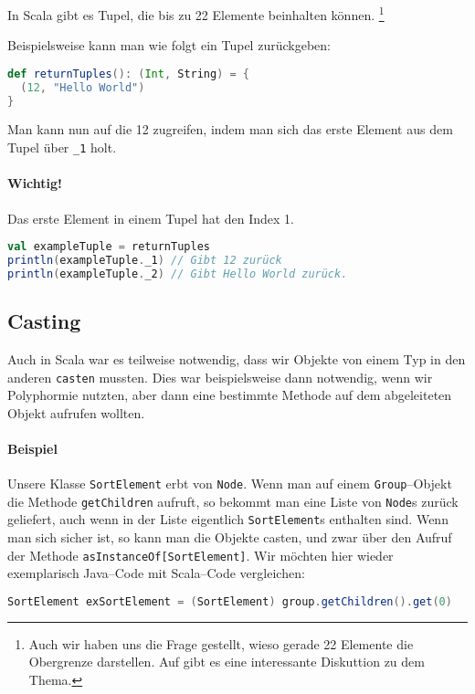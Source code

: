 In Scala gibt es Tupel, die bis zu 22 Elemente beinhalten können. \footnote{Auch wir haben uns die Frage gestellt, wieso gerade 22 Elemente die Obergrenze darstellen. Auf \cite{StackoverflowDiscussion22ElementsInTuples} gibt es eine interessante Diskuttion zu dem Thema.}

Beispielsweise kann man wie folgt ein Tupel zurückgeben:

\begin{lstlisting}[language=Scala, numbers=none]
def returnTuples(): (Int, String) = {
  (12, "Hello World")
}
\end{lstlisting}

Man kann nun auf die 12 zugreifen, indem man sich das erste Element aus dem Tupel über \texttt{\_1} holt.
\paragraph{Wichtig!}Das erste Element in einem Tupel hat den Index 1.

\begin{lstlisting}[language=Scala, numbers=none, caption=Zugriff auf die Elemente eines Tupels]
val exampleTuple = returnTuples
println(exampleTuple._1) // Gibt 12 zurück
println(exampleTuple._2) // Gibt Hello World zurück.
\end{lstlisting}

\subsection{Casting}
Auch in Scala war es teilweise notwendig, dass wir Objekte von einem Typ in den anderen \texttt{casten} mussten. Dies war beispielsweise dann notwendig, wenn wir Polyphormie nutzten, aber dann eine bestimmte Methode auf dem abgeleiteten Objekt aufrufen wollten.

\paragraph{Beispiel} Unsere Klasse \texttt{SortElement} erbt von \texttt{Node}. Wenn man auf einem \texttt{Group}--Objekt die Methode \texttt{getChildren} aufruft, so bekommt man eine Liste von \texttt{Node}s zurück geliefert, auch wenn in der Liste eigentlich \texttt{SortElement}s enthalten sind. Wenn man sich sicher ist, so kann man die Objekte casten, und zwar über den Aufruf der Methode \texttt{asInstanceOf[SortElement]}. Wir möchten hier wieder exemplarisch Java--Code mit Scala--Code vergleichen:

\begin{lstlisting}[language=Java,numbers=none,caption=Casting in Java: Von Node zu SortElement]
SortElement exSortElement = (SortElement) group.getChildren().get(0)
\end{lstlisting}

